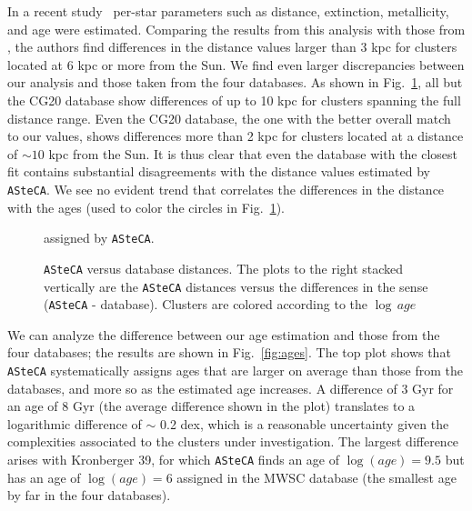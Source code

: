 \documentclass[draft]{aa}
\begin{document}
  In a recent study~\citep{Anders_2021} per-star parameters such as distance,
  extinction, metallicity, and age were estimated. Comparing the results
  from this analysis with those from \cite{Cantat_2020}, the authors find
  differences in the distance values larger than 3 kpc for clusters located at
  6 kpc or more from the Sun. We find even larger discrepancies between our
  analysis and those taken from the four databases. As shown in
  Fig.~\ref{fig:distances}, all but the CG20 database show differences of up
  to 10 kpc for clusters spanning the full distance range. Even the CG20
  database, the one with the better overall match to our values, shows
  differences more than 2 kpc for clusters located at a distance of $\sim10$ kpc
  from the Sun. It is thus clear that even the database with the closest fit
  contains substantial disagreements with the distance values estimated by 
  \texttt{ASteCA}. We see no evident trend that correlates the differences in
  the distance with the ages (used to color the circles in
  Fig.~\ref{fig:distances}).\\


  \begin{figure}
   \caption{\texttt{ASteCA} versus database distances. The plots to the right
   stacked vertically are the \texttt{ASteCA} distances versus the differences
   in the sense (\texttt{ASteCA} - database). Clusters are colored according to
   the $\log\,age$} assigned by \texttt{ASteCA}.
   \label{fig:distances}
  \end{figure}

  We can analyze the difference between our age estimation and those from
  the four databases; the results are shown in Fig.~\ref{fig:ages}. The top plot
  shows that \texttt{ASteCA} systematically assigns ages that are larger on
  average than those from the databases, and more so as the estimated age
  increases. A difference of 3 Gyr for an age of 8 Gyr (the average difference
  shown in the plot) translates to a logarithmic difference of $\sim$ 0.2 dex,
  which is a reasonable uncertainty given the complexities associated to the
  clusters under investigation.
  The largest difference arises with Kronberger 39, for which \texttt{ASteCA}
  finds an age of $\log(age)=9.5$ but has an age of $\log(age)=6$ assigned in
  the MWSC database (the smallest age by far in the four databases).
\end{document}
